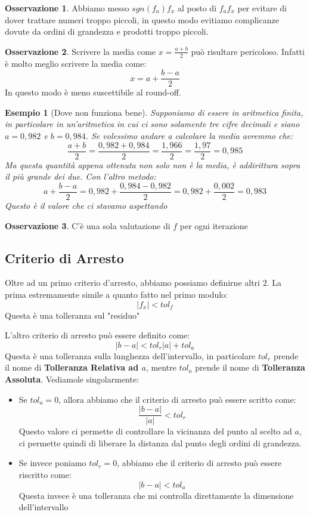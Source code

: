 \documentclass[11pt,a4paper,twoside]{article}
\newtheorem{es}{Esempio}
\theoremstyle{definition}
\newtheorem*{oss}{Osservazione}
\begin{document}
\begin{oss}
	Abbiamo messo $sgn(f_a)f_x$ al posto di $f_af_x$ per evitare di dover trattare numeri troppo piccoli, in questo modo evitiamo complicanze dovute da ordini di grandezza e prodotti troppo piccoli.
\end{oss}

\begin{oss}
	Scrivere la media come $x = \frac{a+b}2$ può risultare pericoloso. Infatti è molto meglio scrivere la media come:
	\[ x = a + \frac{b-a}2 \]
	In questo modo è meno suscettibile al round-off.
\end{oss}

\begin{es}[Dove non funziona bene]
	Supponiamo di essere in aritmetica finita, in particolare in un'aritmetica in cui ci sono solamente tre cifre decimali e siano $a = 0,982$ e $b = 0,984$. Se volessimo andare a calcolare la media avremmo che:
	\[ \frac{a+b}2 = \frac{0,982 + 0,984}2 = \frac{1,966}{2} = \frac{1,97}2 = 0,985 \]
	Ma questa quantità appena ottenuta non solo non è la media, è addirittura sopra il più grande dei due. Con l'altro metodo:
	\[ a + \frac{b-a}2 = 0,982 + \frac{0,984-0,982}2 = 0,982 + \frac{0,002}2 = 0,983 \]
	Questo è il valore che ci stavamo aspettando
\end{es}

\begin{oss}
	C'è una sola valutazione di $f$ per ogni iterazione
\end{oss}

\subsection{Criterio di Arresto}

Oltre ad un primo criterio d'arresto, abbiamo possiamo definirne altri $2$. La prima estremamente simile a quanto fatto nel primo modulo:
\[ |f_x|<tol_f \]
Questa è una tolleranza sul "residuo"

L'altro criterio di arresto può essere definito come:
\[ |b-a|< tol_r|a| + tol_a \]
Questa è una tolleranza sulla lunghezza dell'intervallo, in particolare $tol_r$ prende il nome di \textbf{Tolleranza Relativa ad $a$}, mentre $tol_a$ prende il nome di \textbf{Tolleranza Assoluta}. Vediamole singolarmente:
\begin{itemize}
	\item Se $tol_a = 0$, allora abbiamo che il criterio di arresto può essere scritto come:
		\[ \frac{|b-a|}{|a|}<tol_r \]
		Questo valore ci permette di controllare la vicinanza del punto al scelto ad $a$, ci permette quindi di liberare la distanza dal punto degli ordini di grandezza.
	\item Se invece poniamo $tol_r = 0$, abbiamo che il criterio di arresto può essere riscritto come:
		\[ |b-a|<tol_a \]
		Questa invece è una tolleranza che mi controlla direttamente la dimensione dell'intervallo
\end{itemize}
\end{document}
